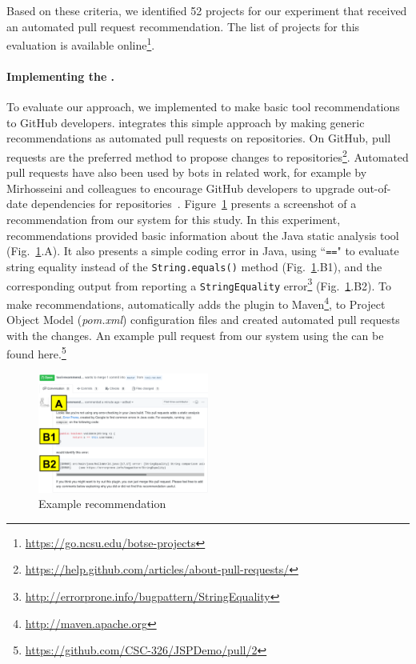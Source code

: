 Based on these criteria, we identified 52 projects for our experiment that received an automated pull request recommendation. The list of projects for this evaluation is available online\footnote{\url{https://go.ncsu.edu/botse-projects}}.

\paragraph{Implementing the \tele.} To evaluate our \tele approach, we implemented \tool to make basic tool recommendations to GitHub developers. \tool integrates this simple approach by making generic recommendations as automated pull requests on repositories. On GitHub, pull requests are the preferred method to propose changes to repositories\footnote{\url{https://help.github.com/articles/about-pull-requests/}}. Automated pull requests have also been used by bots in related work, for example by Mirhosseini and colleagues to encourage GitHub developers to upgrade out-of-date dependencies for repositories~\cite{SamUgrade}. Figure~\ref{fig:tele} presents a screenshot of a recommendation from our system for this study. In this experiment, \tool recommendations provided basic information about the Java static analysis tool \EP  (Fig.~\ref{fig:tele}.A). It also presents a simple coding error in Java, using ``\texttt{==}" to evaluate string equality instead of the \texttt{String.equals()} method (Fig.~\ref{fig:tele}.B1), and the corresponding output from \EP reporting a \texttt{StringEquality} error\footnote{\url{http://errorprone.info/bugpattern/StringEquality}} (Fig.~\ref{fig:tele}.B2). To make recommendations, \tool automatically adds the \EP plugin to Maven\footnote{\url{http://maven.apache.org}}, to Project Object Model (\textit{pom.xml}) configuration files and created automated pull requests with the changes. An example pull request from our system using the \tele can be found here.\footnote{\url{https://github.com/CSC-326/JSPDemo/pull/2}}

\begin{figure}
\centering
	\includegraphics[width=0.5\textwidth]{images/pull.png}
	\caption{Example \tele recommendation}	
	\label{fig:tele} 
\end{figure}

